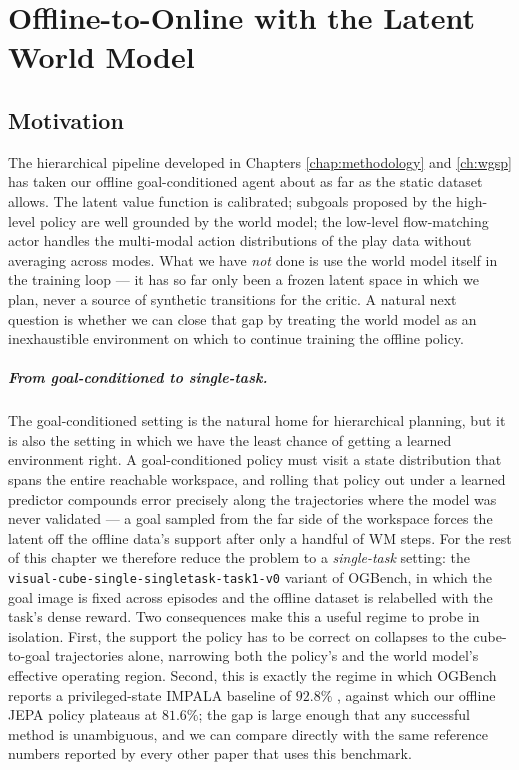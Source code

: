 \chapter{Offline-to-Online with the Latent World Model}
\label{chap:offline-online}

\section{Motivation}
\label{sec:oo-motivation}

The hierarchical pipeline developed in Chapters \ref{chap:methodology} and \ref{ch:wgsp} has taken our offline goal-conditioned agent about as far as the static dataset allows. The latent value function is calibrated; subgoals proposed by the high-level policy are well grounded by the world model; the low-level flow-matching actor handles the multi-modal action distributions of the play data without averaging across modes. What we have \emph{not} done is use the world model itself in the training loop --- it has so far only been a frozen latent space in which we plan, never a source of synthetic transitions for the critic. A natural next question is whether we can close that gap by treating the world model as an inexhaustible environment on which to continue training the offline policy.

\paragraph{From goal-conditioned to single-task.} The goal-conditioned setting is the natural home for hierarchical planning, but it is also the setting in which we have the least chance of getting a learned environment right. A goal-conditioned policy must visit a state distribution that spans the entire reachable workspace, and rolling that policy out under a learned predictor compounds error precisely along the trajectories where the model was never validated --- a goal sampled from the far side of the workspace forces the latent off the offline data's support after only a handful of WM steps. For the rest of this chapter we therefore reduce the problem to a \emph{single-task} setting: the \texttt{visual-cube-single-singletask-task1-v0} variant of OGBench, in which the goal image is fixed across episodes and the offline dataset is relabelled with the task's dense reward. Two consequences make this a useful regime to probe in isolation. First, the support the policy has to be correct on collapses to the cube-to-goal trajectories alone, narrowing both the policy's and the world model's effective operating region. Second, this is exactly the regime in which OGBench reports a privileged-state IMPALA baseline of $92.8\%$ \cite{espeholt2018impala, ogbench_park2025}, against which our offline JEPA policy plateaus at $81.6\%$; the gap is large enough that any successful method is unambiguous, and we can compare directly with the same reference numbers reported by every other paper that uses this benchmark.

